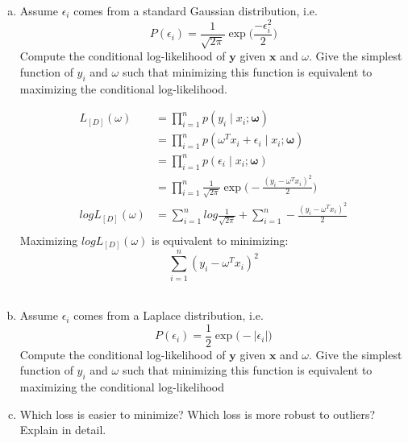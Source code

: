 \documentclass[11pt]{article}
\renewcommand{\vec}[1]{\mathbf{#1}}
\begin{document}
\begin{enumerate}[(a)]
\item Assume $\epsilon_i$ comes from a standard Gaussian distribution, i.e.
$$P(\epsilon_i) =  \frac{1}{\sqrt{2\pi}}\exp{\Big(\frac{-\epsilon_i^2}{2}\Big)}$$
Compute the conditional log-likelihood of $\textbf{y}$ given $\textbf{x}$ and $\omega$.  Give the simplest function of $y_i$ and $\omega$ such that minimizing this function is equivalent to maximizing the conditional log-likelihood. \\
\begin{answertext}{11cm}{}
\begin{align}
L_{[D]}(\omega) &= \prod_{i=1}^n p(y_i \mid x_i; \vec{\omega}) \\
&= \prod_{i=1}^n p(\omega^Tx_i + \epsilon_i \mid x_i; \vec{\omega}) \\
&= \prod_{i=1}^n p(\epsilon_i \mid x_i; \vec{\omega}) \\
&= \prod_{i=1}^n \frac{1}{\sqrt{2\pi}}\exp{\Big(-\frac{(y_i-\omega^Tx_i)^2}{2}\Big)} \\
logL_{[D]}(\omega) &=\sum_{i=1}^n log \frac{1}{\sqrt{2\pi}} + \sum_{i=1}^n -\frac{(y_i-\omega^Tx_i)^2}{2} \\
\end{align}
Maximizing $logL_{[D]}(\omega)$ is equivalent to minimizing: \\
$$\sum_{i=1}^n  (y_i-\omega^Tx_i)^2$$\\
\end{answertext} 

\item Assume $\epsilon_i$ comes from a Laplace distribution, i.e.
$$P(\epsilon_i) =  \frac{1}{2}\exp{\Big(-|\epsilon_i|\Big)}$$
Compute the conditional log-likelihood of $\textbf{y}$ given $\textbf{x}$ and $\omega$.
Give the simplest function of $y_i$ and $\omega$ such that minimizing this function is equivalent to maximizing the conditional log-likelihood \\
\begin{answertext}{9cm}{}


  
\end{answertext} 

\item Which loss is easier to minimize?  Which loss is more robust to outliers?  Explain in detail.\\
\begin{answertext}{9cm}{}


  
\end{answertext} 

\end{enumerate}
\end{document}
